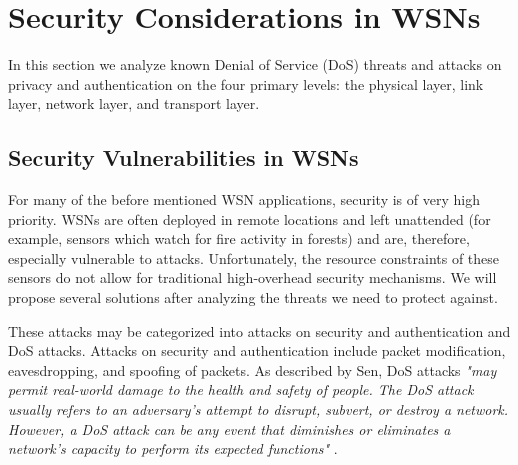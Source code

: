 \documentclass[12pt,a4paper,twoside]{report}
\begin{document}
\section{Security Considerations in WSNs}
\label{sec:security}
In this section we analyze known Denial of Service (DoS) threats and attacks on privacy and authentication on the four primary levels: the physical layer, link layer, network layer, and transport layer. 
\subsection{Security Vulnerabilities in WSNs}
For many of the before mentioned WSN applications, security is of very high priority. WSNs are often deployed in remote locations and left unattended (for example, sensors which watch for fire activity in forests) and are, therefore, especially vulnerable to attacks. Unfortunately, the resource constraints of these sensors do not allow for traditional high-overhead security mechanisms. We will propose several solutions after analyzing the threats we need to protect against. \par
These attacks may be categorized into attacks on security and authentication and DoS attacks. Attacks on security and authentication include packet modification, eavesdropping, and spoofing of packets. As described by Sen, DoS attacks \emph{"may permit real-world damage to the health and safety of people. The DoS attack usually refers to an adversary's attempt to disrupt, subvert, or destroy a network. However, a DoS attack can be any event that diminishes or eliminates a network's capacity to perform its expected functions"} \cite{sen:2009}.\par
\end{document}
